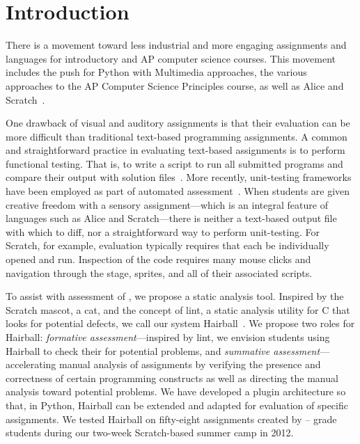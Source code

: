 \section{Introduction}
There is a movement toward less industrial and more engaging assignments and
languages for introductory and AP computer science courses.  This movement
includes the push for Python with Multimedia approaches, the various approaches
to the AP Computer Science Principles course, as well as Alice and
Scratch~\cite{Adams:2012:SLP:2157136.2157319, Forte:2004:CCC:962752.962945,
  Simon:2010:ERC:1822090.1822151, Snyder:2012:FFC:2189835.2189852,
  Cooper:2003:TOI:611892.611966, Maloney:2010:SPL:1868358.1868363}.

One drawback of visual and auditory assignments is that their evaluation can be
more difficult than traditional text-based programming assignments.  A common
and straightforward practice in evaluating text-based assignments is to perform
functional testing. That is, to write a script to run all submitted programs
and compare their output with solution
files~\cite{Jackson:1997:GSP:268084.268210}.  More recently, unit-testing
frameworks have been employed as part of automated
assessment~\cite{Spacco:2006:EMD:1140124.1140131,
  Edwards:2003:RCS:949344.949390}.  When students are given creative freedom
with a sensory assignment---which is an integral feature of languages such as
Alice and Scratch---there is neither a text-based output file with which to
diff, nor a straightforward way to perform unit-testing.  For Scratch, for
example, evaluation typically requires that each \sprogram{} be individually
opened and run.  Inspection of the code requires many mouse clicks and
navigation through the stage, sprites, and all of their associated scripts.

To assist with assessment of , we propose a static analysis tool.
Inspired by the Scratch mascot, a cat, and the concept of lint, a static
analysis utility for C that looks for potential defects, we call our system
Hairball~\cite{Johnson78lint}. We propose two roles for Hairball:
\emph{formative assessment}---inspired by lint, we envision students using
Hairball to check their  for potential problems, and
\emph{summative assessment}---accelerating manual analysis of assignments by
verifying the presence and correctness of certain programming constructs as
well as directing the manual analysis toward potential problems.  We have
developed a plugin architecture so that, in Python, Hairball can be extended
and adapted for evaluation of specific assignments. We tested Hairball on
fifty-eight assignments created by -- grade students during our
two-week Scratch-based summer camp in 2012.

